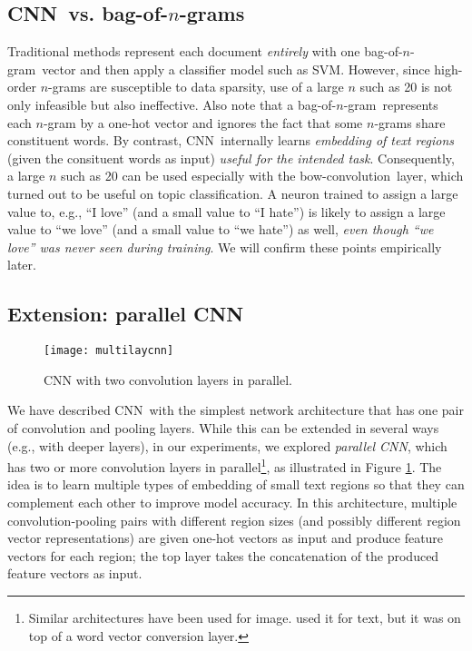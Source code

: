 \documentclass[11pt,letterpaper]{article}
\newcommand{\cnn}{CNN}
\newcommand{\bconv}{bow-convolution}
\newcommand{\bongram}{bag-of-$n$-gram}
\newcommand{\bongrams}{bag-of-$n$-grams}
\begin{document}
\subsection{\cnn\ vs. \bongrams}
\label{sec:cnn-vs-bow}
Traditional 
methods represent each document {\em entirely} with 
one \bongram\ vector 
and then apply a classifier model such as SVM. 
However, 
since high-order $n$-grams are 
susceptible to data sparsity, use of a large $n$ such as 20 is not only 
infeasible but also ineffective.  
Also 
note that a \bongram\ represents each $n$-gram by a one-hot vector 
and ignores the fact that some $n$-grams share constituent words.  
By contrast, \cnn\  internally learns {\em embedding of text regions} (given the consituent words as input) 
{\em useful for the intended task}.  
Consequently, 
a large $n$ such as 20 can be used especially with the \bconv\ layer, 
which turned out to be useful on topic classification.
A neuron 
trained to assign a large value to, e.g., ``I love'' (and a small value to ``I hate'') 
is likely to assign a large value to ``we love'' (and a small value to ``we hate'') 
as well, {\em even though ``we love'' was never seen during training}.  
We will confirm these points empirically later.  


\subsection{Extension: parallel \cnn}

\begin{figure}
\centering
\texttt{[image: multilaycnn]}
\caption{\label{fig:multilaycnn} \footnotesize CNN with two convolution layers in parallel.  
}
\end{figure}


We have described \cnn\ with the simplest network architecture that has one pair of 
convolution and pooling layers.  While this can be extended in several ways (e.g., 
with deeper layers), in our experiments, 
we explored {\em parallel \cnn}, which has 
two or more convolution layers in parallel\footnote{
  Similar architectures have been used for image.  
   used it for text, but it was on top of a word vector conversion layer. 
}, 
as illustrated in Figure \ref{fig:multilaycnn}. 
The idea is to learn multiple types of embedding of small text regions so that they can complement 
each other to improve model accuracy.  
In this architecture, 
multiple convolution-pooling pairs with different region sizes (and possibly 
different region vector representations) are given one-hot vectors as input and produce 
feature vectors for each region; the top layer takes the concatenation of the produced 
feature vectors as input.  
\end{document}

